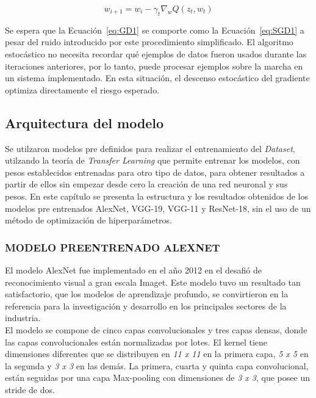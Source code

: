 \begin{equation}
	\label{eq:SGD1}
	{w_{i+1}=w_i-\gamma_t\nabla_w Q(z_t,w_t)}
\end{equation}

Se espera que la Ecuación~\ref{eq:GD1} se comporte como la Ecuación~\ref{eq:SGD1} a pesar del ruido introducido por este procedimiento simplificado. El algoritmo estocástico no necesita recordar qué ejemplos de datos fueron usados durante las iteraciones anteriores, por lo tanto, puede procesar ejemplos sobre la marcha en un sistema implementado. En esta situación, el descenso estocástico del gradiente optimiza directamente el riesgo esperado.	

\subsection{Arquitectura del modelo}

Se utilzaron modelos pre definidos para realizar el entrenamiento del \textit{Dataset}, utilzando la teoría de \textit{Transfer Learning} que permite entrenar los modelos, con pesos establecidos entrenadas para otro tipo de datos, para obtener resultados a partir de ellos sin empezar desde cero la creación de una red neuronal y sus pesos. En este capítulo se presenta la estructura y los resultados obtenidos de los modelos pre entrenados AlexNet, VGG-19, VGG-11 y ResNet-18, sin el uso de un método de optimización de hiperparámetros.

\subsubsection{\MakeUppercase{Modelo preentrenado ALEXNET}}

El modelo AlexNet fue implementado en el año 2012 en el desafió de reconocimiento visual a gran escala Imaget. Este modelo tuvo un resultado tan satisfactorio, que los modelos de aprendizaje profundo, se convirtieron en la referencia para la investigación y desarrollo en los principales sectores de la industria. \cite{Pytorch}\\


El modelo se compone de cinco capas convolucionales y tres capas densas, donde las capas convolucionales están normalizadas por lotes. El kernel tiene dimensiones diferentes que se distribuyen en \textit{11 x 11} en la primera capa, \textit{5 x 5} en la segunda y \textit{3 x 3} en las demás. La primera, cuarta y quinta capa convolucional, están seguidas por una capa Max-pooling con dimensiones de \textit{3 x 3}, que posee un stride de dos.\\


